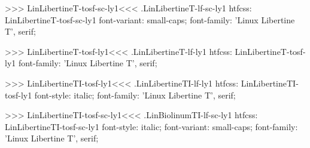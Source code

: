 {{{>>>
\<LinLibertineT-tosf-sc-ly1\><<<
.LinLibertineT-lf-sc-ly1
htfcss:  LinLibertineT-tosf-sc-ly1  font-variant: small-caps; font-family: 'Linux Libertine T', serif;

>>>
\<LinLibertineT-tosf-ly1\><<<
.LinLibertineT-lf-ly1
htfcss:  LinLibertineT-tosf-ly1  font-family: 'Linux Libertine T', serif;

>>>
\<LinLibertineTI-tosf-ly1\><<<
.LinLibertineTI-lf-ly1
htfcss:  LinLibertineTI-tosf-ly1  font-style: italic; font-family: 'Linux Libertine T', serif;

>>>
\<LinLibertineTI-tosf-sc-ly1\><<<
.LinBiolinumTI-lf-sc-ly1
htfcss:  LinLibertineTI-tosf-sc-ly1  font-style: italic; font-variant: small-caps; font-family: 'Linux Libertine T', serif;

}}}
